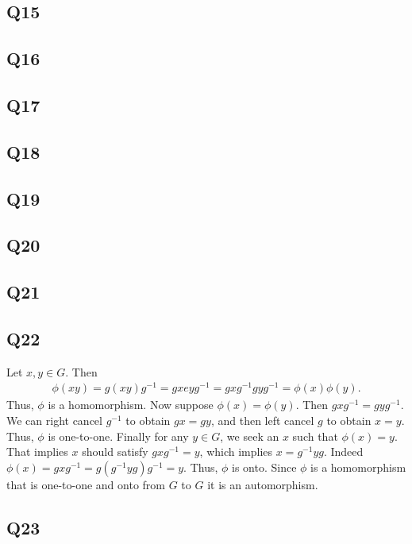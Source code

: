 \documentclass[12pt]{article}
\numberwithin{theorem}{section}
\numberwithin{equation}{section}
\numberwithin{remark}{section}
\numberwithin{definition}{section}
\numberwithin{theorem}{section}
\numberwithin{lemma}{section}
\numberwithin{example}{section}
\begin{document}
\subsection{Q15}

\subsection{Q16}

\subsection{Q17}

\subsection{Q18}

\subsection{Q19}

\subsection{Q20}

\subsection{Q21}

\subsection{Q22}

Let $x,y\in G$. Then 
\begin{align*}
	\phi(xy)=g(xy)g^{-1}=gxeyg^{-1}=gxg^{-1}gyg^{-1}=\phi(x)\phi(y).
\end{align*}
Thus, $\phi$ is a homomorphism. Now suppose $\phi(x)=\phi(y)$. Then $gxg^{-1}=gyg^{-1}$. We can right cancel $g^{-1}$ to obtain $gx=gy$, and then left cancel $g$ to obtain $x=y$. Thus, $\phi$ is one-to-one. Finally for any $y\in G$, we seek an $x$ such that $\phi(x)=y$. That implies $x$ should satisfy $gxg^{-1}=y$, which implies $x=g^{-1}yg$. Indeed $\phi(x)=gxg^{-1}=g(g^{-1}yg)g^{-1}=y$. Thus, $\phi$ is onto. Since $\phi$ is a homomorphism that is one-to-one and onto from $G$ to $G$ it is an automorphism.



\subsection{Q23}
\end{document}
